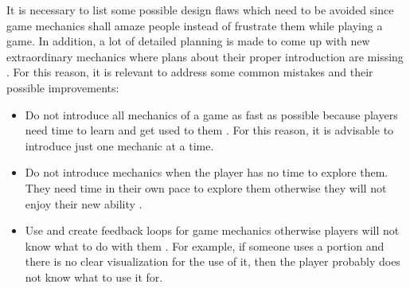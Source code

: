 \documentclass[MGS,Master,english]{twbook}%
\begin{document}
It is necessary to list some possible design flaws which need to be avoided since game mechanics shall amaze people instead of frustrate them while playing a game. In addition, a lot of detailed planning is made to come up with new extraordinary mechanics where plans about their proper introduction are missing \cite{mechanic::gamasutra::MaxPears}. For this reason, it is relevant to address some common mistakes and their possible improvements:
\begin{itemize}
	\item Do not introduce all mechanics of a game as fast as possible because players need time to learn and get used to them \cite{mechanic::gamasutra::MaxPears}. For this reason, it is advisable to introduce just one mechanic at a time. 
	\item Do not introduce mechanics when the player has no time to explore them. They need time in their own pace to explore them otherwise they will not enjoy their new ability \cite{mechanic::gamasutra::MaxPears}. 
	\item Use and create feedback loops for game mechanics otherwise players will not know what to do with them \cite{gameDesign::gameMechanicsAdvancedGameDesign}. For example, if someone uses a portion and there is no clear visualization for the use of it, then the player probably does not know what to use it for.
	

\end{itemize}
\end{document}
